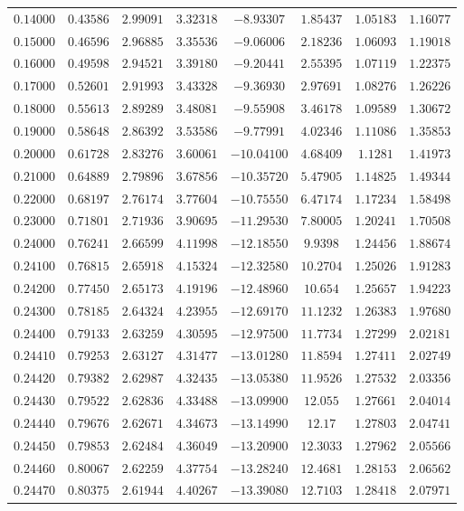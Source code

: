 \documentclass{caosp308}
\begin{document}
\begin{table}[htb]
{{\begin{tabular}{cccccccc}
$0.14000$ & $0.43586$ & $2.99091$ & $3.32318$ & $-8.93307$ & $1.85437$ & $1.05183$ & $1.16077$\\
$0.15000$ & $0.46596$ & $2.96885$ & $3.35536$ & $-9.06006$ & $2.18236$ & $1.06093$ & $1.19018$\\
$0.16000$ & $0.49598$ & $2.94521$ & $3.39180$ & $-9.20441$ & $2.55395$ & $1.07119$ & $1.22375$\\
$0.17000$ & $0.52601$ & $2.91993$ & $3.43328$ & $-9.36930$ & $2.97691$ & $1.08276$ & $1.26226$\\
$0.18000$ & $0.55613$ & $2.89289$ & $3.48081$ & $-9.55908$ & $3.46178$ & $1.09589$ & $1.30672$\\
$0.19000$ & $0.58648$ & $2.86392$ & $3.53586$ & $-9.77991$ & $4.02346$ & $1.11086$ & $1.35853$\\
$0.20000$ & $0.61728$ & $2.83276$ & $3.60061$ & $-10.04100$ & $4.68409$ & $1.1281$ & $1.41973$\\
$0.21000$ & $0.64889$ & $2.79896$ & $3.67856$ & $-10.35720$ & $5.47905$ & $1.14825$ & $1.49344$\\
$0.22000$ & $0.68197$ & $2.76174$ & $3.77604$ & $-10.75550$ & $6.47174$ & $1.17234$ & $1.58498$\\
$0.23000$ & $0.71801$ & $2.71936$ & $3.90695$ & $-11.29530$ & $7.80005$ & $1.20241$ & $1.70508$\\
$0.24000$ & $0.76241$ & $2.66599$ & $4.11998$ & $-12.18550$ & $9.9398$ & $1.24456$ & $1.88674$\\
$0.24100$ & $0.76815$ & $2.65918$ & $4.15324$ & $-12.32580$ & $10.2704$ & $1.25026$ & $1.91283$\\
$0.24200$ & $0.77450$ & $2.65173$ & $4.19196$ & $-12.48960$ & $10.654$ & $1.25657$ & $1.94223$\\
$0.24300$ & $0.78185$ & $2.64324$ & $4.23955$ & $-12.69170$ & $11.1232$ & $1.26383$ & $1.97680$\\
$0.24400$ & $0.79133$ & $2.63259$ & $4.30595$ & $-12.97500$ & $11.7734$ & $1.27299$ & $2.02181$\\
$0.24410$ & $0.79253$ & $2.63127$ & $4.31477$ & $-13.01280$ & $11.8594$ & $1.27411$ & $2.02749$\\
$0.24420$ & $0.79382$ & $2.62987$ & $4.32435$ & $-13.05380$ & $11.9526$ & $1.27532$ & $2.03356$\\
$0.24430$ & $0.79522$ & $2.62836$ & $4.33488$ & $-13.09900$ & $12.055$ & $1.27661$ & $2.04014$\\
$0.24440$ & $0.79676$ & $2.62671$ & $4.34673$ & $-13.14990$ & $12.17$ & $1.27803$ & $2.04741$\\
$0.24450$ & $0.79853$ & $2.62484$ & $4.36049$ & $-13.20900$ & $12.3033$ & $1.27962$ & $2.05566$\\
$0.24460$ & $0.80067$ & $2.62259$ & $4.37754$ & $-13.28240$ & $12.4681$ & $1.28153$ & $2.06562$\\
$0.24470$ & $0.80375$ & $2.61944$ & $4.40267$ & $-13.39080$ & $12.7103$ & $1.28418$ & $2.07971$\\
\hline\hline
\end{tabular}}}
\end{table}
\end{document}
